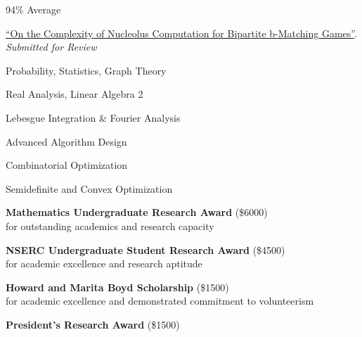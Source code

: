 \documentclass[11pt,a4paper,ragged2e]{altacv}
\begin{document}
\begin{paracol}{2}
94\% Average

\href{https://arxiv.org/abs/2105.07161}{\faExternalLink* ``On the Complexity of Nucleolus Computation for Bipartite b-Matching Games''}.
\emph{Submitted for Review}

Probability, Statistics, Graph Theory

\smallskip

Real Analysis, Linear Algebra 2

\smallskip

Lebesgue Integration \& Fourier Analysis

\divider\smallskip

Advanced Algorithm Design

\smallskip

Combinatorial Optimization

\smallskip

Semidefinite and Convex Optimization


\textbf{Mathematics Undergraduate Research Award} (\$6000)\\
  for outstanding academics and research capacity

\divider\smallskip

\textbf{NSERC Undergraduate Student Research Award} (\$4500)\\
  for academic excellence and research aptitude

\divider\smallskip

\textbf{Howard and Marita Boyd Scholarship} (\$1500) \\
for academic excellence and demonstrated commitment to volunteerism

\divider\smallskip

\textbf{President's Research Award} (\$1500)

\iffalse
\divider\smallskip

\cvevent{President's Scholarship of Distinction}{University of Waterloo}{September 2017}{}
for entrance average above 95\%
\fi

\end{paracol}
\end{document}
